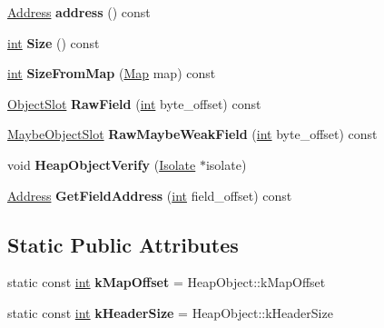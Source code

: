 \begin{DoxyCompactItemize}
\mbox{\hyperlink{classuintptr__t}{Address}} {\bfseries address} () const
\item 
\mbox{\label{classv8_1_1internal_1_1HeapObjectPtr_a8ba8830262743f4a74109e04897238af}} 
\mbox{\hyperlink{classint}{int}} {\bfseries Size} () const
\item 
\mbox{\label{classv8_1_1internal_1_1HeapObjectPtr_af1b761960b2eb98da0823e05c3b159d2}} 
\mbox{\hyperlink{classint}{int}} {\bfseries Size\+From\+Map} (\mbox{\hyperlink{classv8_1_1internal_1_1Map}{Map}} map) const
\item 
\mbox{\label{classv8_1_1internal_1_1HeapObjectPtr_a4d62e4ef9daf583b3410015a92917848}} 
\mbox{\hyperlink{classv8_1_1internal_1_1ObjectSlot}{Object\+Slot}} {\bfseries Raw\+Field} (\mbox{\hyperlink{classint}{int}} byte\+\_\+offset) const
\item 
\mbox{\label{classv8_1_1internal_1_1HeapObjectPtr_ae08c7bc39af1acf23dfa5122546d6cff}} 
\mbox{\hyperlink{classv8_1_1internal_1_1MaybeObjectSlot}{Maybe\+Object\+Slot}} {\bfseries Raw\+Maybe\+Weak\+Field} (\mbox{\hyperlink{classint}{int}} byte\+\_\+offset) const
\item 
\mbox{\label{classv8_1_1internal_1_1HeapObjectPtr_ae33920e79786004e964b51007612407f}} 
void {\bfseries Heap\+Object\+Verify} (\mbox{\hyperlink{classv8_1_1internal_1_1Isolate}{Isolate}} $\ast$isolate)
\item 
\mbox{\label{classv8_1_1internal_1_1HeapObjectPtr_adcb650fa74fc76da838bd8a538bf1f03}} 
\mbox{\hyperlink{classuintptr__t}{Address}} {\bfseries Get\+Field\+Address} (\mbox{\hyperlink{classint}{int}} field\+\_\+offset) const
\end{DoxyCompactItemize}
\subsection*{Static Public Attributes}
\begin{DoxyCompactItemize}
\item 
\mbox{\label{classv8_1_1internal_1_1HeapObjectPtr_aef3782b22ad83fd4fbd5e65a26e1d99a}} 
static const \mbox{\hyperlink{classint}{int}} {\bfseries k\+Map\+Offset} = Heap\+Object\+::k\+Map\+Offset
\item 
\mbox{\label{classv8_1_1internal_1_1HeapObjectPtr_a41096931a164a1aeddcabb8dcf47585d}} 
static const \mbox{\hyperlink{classint}{int}} {\bfseries k\+Header\+Size} = Heap\+Object\+::k\+Header\+Size
\end{DoxyCompactItemize}
